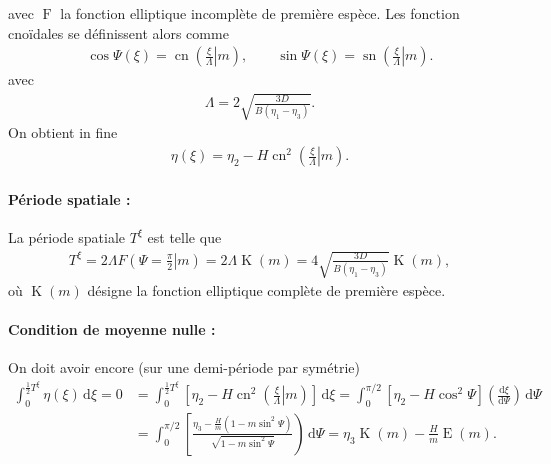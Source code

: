 \documentclass[10pt,a4paper, oneside, fleqn]{myarticle}
\newcommand{\dd}{\mathrm{d}}
\newcommand{\idd}{\,\mathrm{d}}
\DeclareMathOperator{\ellipF}{F}
\DeclareMathOperator{\ellipE}{E}
\DeclareMathOperator{\ellipK}{K}
\DeclareMathOperator{\cn}{cn}
\DeclareMathOperator{\sn}{sn}
\newcommand{\cnoidal}[2]{\cn\left(\left. #1\right\vert #2\right)}
\newcommand{\snoidal}[2]{\sn\left(\left. #1\right\vert #2\right)}
\begin{document}
avec $\ellipF$ la fonction elliptique incomplète de première espèce. Les fonction cnoïdales se définissent alors comme
\begin{gather}
  \cos \Psi(\xi) = \cnoidal {\frac{\xi}{\Lambda}}{m},
  \qquad
  \sin \Psi(\xi) = \snoidal {\frac{\xi}{\Lambda}}{m}.
\end{gather}
avec
\begin{gather}
  \Lambda = 2\sqrt{\frac{3D}{B (\eta_1-\eta_3)}}. \label{def_Lambda_prime}
\end{gather}
On obtient in fine
\begin{gather}
  \eta(\xi) = \eta_2 - H \cn^2 \left(\left. \frac{\xi}{\Lambda} \right\vert m\right).
\end{gather}

\paragraph{Période spatiale :} La période spatiale $T^\xi$ est telle que
\begin{gather}
  T^\xi = 2 \Lambda F\left(\left.\Psi=\frac{\pi}{2}\right\vert m\right)= 2\Lambda \ellipK(m) = 4 \sqrt{\frac{3D}{B (\eta_1-\eta_3)}}\ellipK(m), \label{expr_Txi2}
\end{gather}
où $\ellipK(m)$ désigne la fonction elliptique complète de première espèce.

\paragraph{Condition de moyenne nulle :} On doit avoir encore (sur une demi-période par symétrie)
\begin{align}
  \int_0^{\frac12 T^\xi} \eta(\xi) \idd \xi = 0 &=  \int_0^{\frac12 T^\xi} \left[\eta_2-H\cn^2\left(\left.\frac{\xi}{\Lambda}\right\vert m\right)\right] \idd \xi = \int_0^{\pi/2}\left[\eta_2-H\cos^2\Psi\right]\left(\frac{\dd \xi}{\dd \Psi}\right)\idd\Psi\\
  &=\int_0^{\pi/2}\left[\frac{\eta_3-\frac{H}{m}(1-m\sin^2\Psi)}{\sqrt{1-m\sin^2\Psi}}\right)\idd\Psi=\eta_3\ellipK(m) - \frac{H}{m}\ellipE(m).
\end{align}
\end{document}
